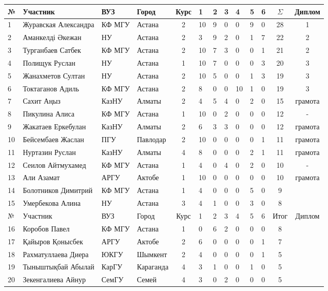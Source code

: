 \begin{tabular}{|l|l|l|l|c|*{6}{p{0.3cm}|}c|c|}
\hline
№ & Участник & ВУЗ & Город & Курс & 1 & 2 & 3 & 4 & 5 & 6 & $\Sigma$ & Диплом\\
\hline
1 & Журавская Александра & КФ МГУ  & Астана & 2 & 10 & 9 & 0 & 0 & 9 & 0 & 28 & 1\\ 
\hline
2 & Аманкелді Әкежан & НУ  & Астана &  2 & 3 & 9 & 2 & 0 & 1 & 7 & 22 & 2\\ 
\hline
3 & Турганбаев Сатбек & КФ МГУ  & Астана & 2 & 10 & 7 & 3 & 0 & 0 & 1 & 21 & 2\\ 
\hline
4 & Полищук Руслан & НУ  & Астана & 1 & 10 & 7 & 0 & 0 & 0 & 3 & 20 & 3\\ 
\hline
5 & Жанахметов Султан & НУ  & Астана & 2 & 10 & 5 & 0 & 0 & 1 & 3 & 19 & 3\\ 
\hline
6 & Токтаганов Адиль & КФ МГУ  & Астана & 2 & 8 & 0 & 0 & 10 & 1 & 0 & 19 & 3\\ 
\hline
7 & Сахит Аңыз & КазНУ  & Алматы & 2 & 4 & 5 & 4 & 0 & 2 & 0 & 15 & грамота\\ 
\hline
8 & Пикулина Алиса & КФ МГУ  & Астана & 1 & 10 & 0 & 2 & 0 & 0 & 0 & 12 & -\\ 
\hline
9 & Жакатаев Еркебулан & КазНУ  & Алматы & 2 & 6 & 3 & 3 & 0 & 0 & 0 & 12 & грамота\\ 
\hline
10 & Бейсембаев Жаслан & ПГУ  & Павлодар & 2 & 10 & 0 & 0 & 0 & 0 & 1 & 11 & грамота\\ 
\hline
11 & Нуртазин Руслан & КазНУ  & Алматы & 4 & 8 & 0 & 0 & 0 & 2 & 1 & 11 & грамота\\ 
\hline
12 & Сеилов Айтмухамед & КФ МГУ  & Астана & 1 & 4 & 0 & 4 & 0 & 2 & 0 & 10 & -\\ 
\hline
13 & Али Азамат & АРГУ  & Актобе & 1 & 10 & 0 & 0 & 0 & 0 & 0 & 10 & грамота\\ 
\hline
14 & Болотников Димитрий & КФ МГУ  & Астана & 1 & 4 & 0 & 0 & 0 & 5 & 0 & 9 & \\ 
\hline
15 & Умербекова Алина & НУ  & Астана & 3 & 4 & 1 & 0 & 0 & 3 & 0 & 8 & \\ 
\hline
№ & Участник & ВУЗ & Город & Курс & 1 & 2 & 3 & 4 & 5 & 6 & Итог & Диплом\\
\hline
16 & Коробов Павел & КФ МГУ  & Астана & 1 & 0 & 6 & 2 & 0 & 0 & 0 & 8 & \\ 
\hline
17 & Қайыров Қонысбек & АРГУ  & Актобе & 2 & 6 & 0 & 0 & 0 & 0 & 1 & 7 & \\ 
\hline
18 & Рахматуллаева Диера & ЮКГУ  & Шымкент & 2 & 4 & 0 & 0 & 0 & 0 & 1 & 5 & \\ 
\hline
19 & Тыныштықбай Абылай & КарГУ  & Караганда & 4 & 3 & 1 & 0 & 0 & 1 & 0 & 5 & \\ 
\hline
20 & Зекенгалиева Айнур & СемГУ  & Семей & 4 & 3 & 0 & 2 & 0 & 0 & 0 & 5 & \\ 
\hline
\end{tabular}


